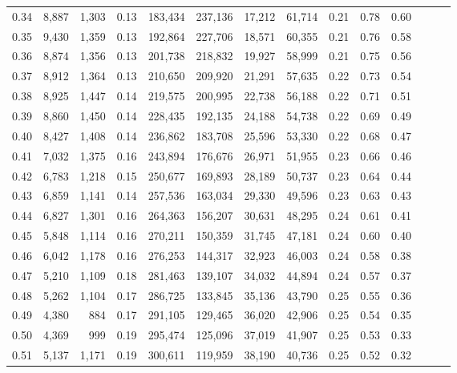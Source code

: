 \begin{tabular}{rrrrrrrrrrrrrr}
0.34 &   8,887 &  1,303 &  0.13 &  183,434 &  237,136 &  17,212 &  61,714 &  0.21 &  0.78 &      0.60 \\
0.35 &   9,430 &  1,359 &  0.13 &  192,864 &  227,706 &  18,571 &  60,355 &  0.21 &  0.76 &      0.58 \\
0.36 &   8,874 &  1,356 &  0.13 &  201,738 &  218,832 &  19,927 &  58,999 &  0.21 &  0.75 &      0.56 \\
0.37 &   8,912 &  1,364 &  0.13 &  210,650 &  209,920 &  21,291 &  57,635 &  0.22 &  0.73 &      0.54 \\
0.38 &   8,925 &  1,447 &  0.14 &  219,575 &  200,995 &  22,738 &  56,188 &  0.22 &  0.71 &      0.51 \\
0.39 &   8,860 &  1,450 &  0.14 &  228,435 &  192,135 &  24,188 &  54,738 &  0.22 &  0.69 &      0.49 \\
0.40 &   8,427 &  1,408 &  0.14 &  236,862 &  183,708 &  25,596 &  53,330 &  0.22 &  0.68 &      0.47 \\
0.41 &   7,032 &  1,375 &  0.16 &  243,894 &  176,676 &  26,971 &  51,955 &  0.23 &  0.66 &      0.46 \\
0.42 &   6,783 &  1,218 &  0.15 &  250,677 &  169,893 &  28,189 &  50,737 &  0.23 &  0.64 &      0.44 \\
0.43 &   6,859 &  1,141 &  0.14 &  257,536 &  163,034 &  29,330 &  49,596 &  0.23 &  0.63 &      0.43 \\
0.44 &   6,827 &  1,301 &  0.16 &  264,363 &  156,207 &  30,631 &  48,295 &  0.24 &  0.61 &      0.41 \\
0.45 &   5,848 &  1,114 &  0.16 &  270,211 &  150,359 &  31,745 &  47,181 &  0.24 &  0.60 &      0.40 \\
0.46 &   6,042 &  1,178 &  0.16 &  276,253 &  144,317 &  32,923 &  46,003 &  0.24 &  0.58 &      0.38 \\
0.47 &   5,210 &  1,109 &  0.18 &  281,463 &  139,107 &  34,032 &  44,894 &  0.24 &  0.57 &      0.37 \\
0.48 &   5,262 &  1,104 &  0.17 &  286,725 &  133,845 &  35,136 &  43,790 &  0.25 &  0.55 &      0.36 \\
0.49 &   4,380 &    884 &  0.17 &  291,105 &  129,465 &  36,020 &  42,906 &  0.25 &  0.54 &      0.35 \\
0.50 &   4,369 &    999 &  0.19 &  295,474 &  125,096 &  37,019 &  41,907 &  0.25 &  0.53 &      0.33 \\
0.51 &   5,137 &  1,171 &  0.19 &  300,611 &  119,959 &  38,190 &  40,736 &  0.25 &  0.52 &      0.32 \\

\end{tabular}
